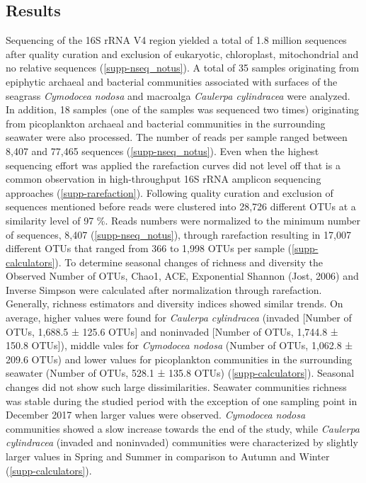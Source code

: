 \documentclass[12pt,]{article}
\begin{document}
\hypertarget{results}{%
\subsection{Results}\label{results}}

Sequencing of the 16S rRNA V4 region yielded a total of 1.8 million
sequences after quality curation and exclusion of eukaryotic,
chloroplast, mitochondrial and no relative sequences
(\autoref{supp-nseq_notus}). A total of 35 samples originating from
epiphytic archaeal and bacterial communities associated with surfaces of
the seagrass \emph{Cymodocea nodosa} and macroalga \emph{Caulerpa
cylindracea} were analyzed. In addition, 18 samples (one of the samples
was sequenced two times) originating from picoplankton archaeal and
bacterial communities in the surrounding seawater were also processed.
The number of reads per sample ranged between 8,407 and 77,465 sequences
(\autoref{supp-nseq_notus}). Even when the highest sequencing effort was
applied the rarefaction curves did not level off that is a common
observation in high-throughput 16S rRNA amplicon sequencing approaches
(\autoref{supp-rarefaction}). Following quality curation and exclusion
of sequences mentioned before reads were clustered into 28,726 different
OTUs at a similarity level of 97 \si{\percent}. Reads numbers were
normalized to the minimum number of sequences, 8,407
(\autoref{supp-nseq_notus}), through rarefaction resulting in 17,007
different OTUs that ranged from 366 to 1,998 OTUs per sample
(\autoref{supp-calculators}). To determine seasonal changes of richness
and diversity the Observed Number of OTUs, Chao1, ACE, Exponential
Shannon (Jost, 2006) and Inverse Simpson were calculated after
normalization through rarefaction. Generally, richness estimators and
diversity indices showed similar trends. On average, higher values were
found for \emph{Caulerpa cylindracea} (invaded {[}Number of OTUs,
1,688.5 ± 125.6 OTUs{]} and noninvaded {[}Number of OTUs, 1,744.8 ±
150.8 OTUs{]}), middle vales for \emph{Cymodocea nodosa} (Number of
OTUs, 1,062.8 ± 209.6 OTUs) and lower values for picoplankton
communities in the surrounding seawater (Number of OTUs, 528.1 ± 135.8
OTUs) (\autoref{supp-calculators}). Seasonal changes did not show such
large dissimilarities. Seawater communities richness was stable during
the studied period with the exception of one sampling point in December
2017 when larger values were observed. \emph{Cymodocea nodosa}
communities showed a slow increase towards the end of the study, while
\emph{Caulerpa cylindracea} (invaded and noninvaded) communities were
characterized by slightly larger values in Spring and Summer in
comparison to Autumn and Winter (\autoref{supp-calculators}).
\end{document}
